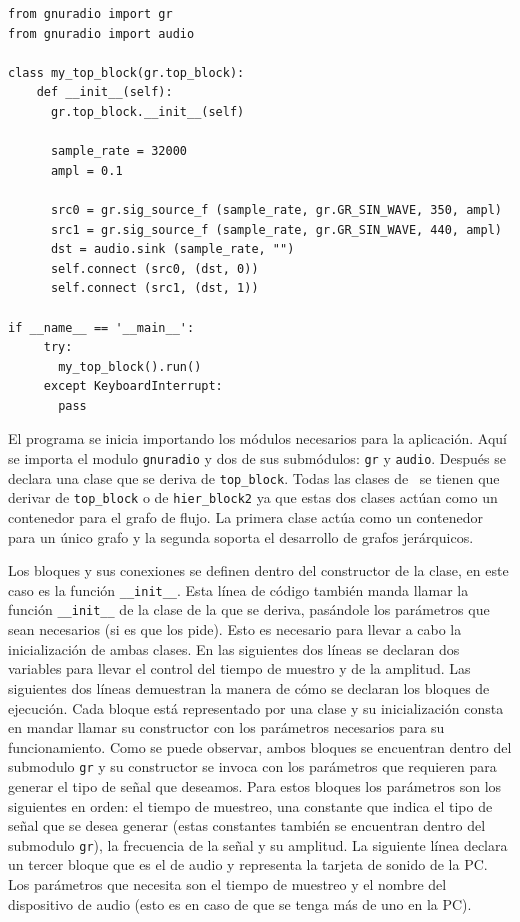 \begin{lstlisting}[float,frame=single,label=ex:radioexp,caption={Ejemplo de programa utilizando \gnuradio}] 
from gnuradio import gr 
from gnuradio import audio

class my_top_block(gr.top_block):
    def __init__(self):
      gr.top_block.__init__(self)

      sample_rate = 32000
      ampl = 0.1

      src0 = gr.sig_source_f (sample_rate, gr.GR_SIN_WAVE, 350, ampl)
      src1 = gr.sig_source_f (sample_rate, gr.GR_SIN_WAVE, 440, ampl)
      dst = audio.sink (sample_rate, "")
      self.connect (src0, (dst, 0))
      self.connect (src1, (dst, 1))

if __name__ == '__main__':
     try:
       my_top_block().run()
     except KeyboardInterrupt:
       pass
\end{lstlisting}

El programa se inicia importando los m\'odulos necesarios para la aplicaci\'on.
Aqu\'i se importa el modulo \verb|gnuradio| y dos de sus subm\'odulos: \verb|gr| y
\verb|audio|. Despu\'es se declara una clase que se deriva de \verb|top_block|.
Todas las clases de \gnuradio\ se tienen que derivar de
\verb|top_block| o de \verb|hier_block2| ya que estas dos clases act\'uan como
un contenedor para el grafo de flujo. La primera clase act\'ua como un
contenedor para un \'unico grafo y la segunda soporta el desarrollo de
grafos jer\'arquicos.

Los bloques y sus conexiones se definen dentro del constructor de la clase, en
este caso es la funci\'on \verb|__init__|. Esta l\'inea de c\'odigo tambi\'en
manda llamar la funci\'on \verb|__init__| de la clase de la que se deriva,
pas\'andole los par\'ametros que sean necesarios (si es que los pide). Esto es
necesario para llevar a cabo la inicializaci\'on de ambas clases. En las
siguientes dos l\'ineas se declaran dos variables para llevar el control del
tiempo de muestro y de la amplitud. Las siguientes dos l\'ineas demuestran la
manera de c\'omo se declaran los bloques de ejecuci\'on. Cada bloque est\'a
representado por una clase y su inicializaci\'on consta en mandar llamar su
constructor con los par\'ametros necesarios para su funcionamiento. Como se
puede observar, ambos bloques se encuentran dentro del submodulo \verb|gr| y su
constructor se invoca con los par\'ametros que requieren para generar el tipo de
se\~nal que deseamos. Para estos bloques los par\'ametros son los siguientes en
orden: el tiempo de muestreo, una constante que indica el tipo de se\~nal que se
desea generar (estas constantes tambi\'en se encuentran dentro del submodulo
\verb|gr|), la frecuencia de la se\~nal y su amplitud. La siguiente l\'inea
declara un tercer bloque que es el de audio y representa la tarjeta de sonido de
la PC. Los par\'ametros que necesita son el tiempo de muestreo y el nombre del
dispositivo de audio (esto es en caso de que se tenga m\'as de uno en la PC).

